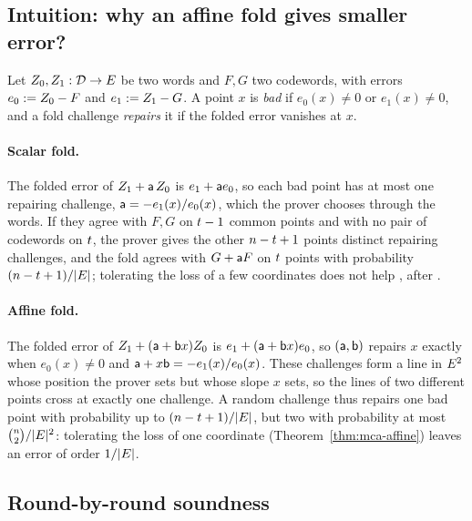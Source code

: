 \subsection{Intuition: why an affine fold gives smaller error?}\label{sec:affine-intuition}

Let $Z_0,Z_1:\mathcal{D}\to E$ be two words and $F,G$ two codewords, with errors $e_0:=Z_0-F$ and $e_1:=Z_1-G$. A point $x$ is \emph{bad} if $e_0(x)\neq0$ or $e_1(x)\neq0$, and a fold challenge \emph{repairs} it if the folded error vanishes at $x$.

\paragraph{Scalar fold.} The folded error of $Z_1+\mathsf{a}\,Z_0$ is $e_1+\mathsf{a} e_0$, so each bad point has at most one repairing challenge, $\mathsf{a}=-e_1(x)/e_0(x)$, which the prover chooses through the words. If they agree with $F,G$ on $t-1$ common points and with no pair of codewords on $t$, the prover gives the other $n-t+1$ points distinct repairing challenges, and the fold agrees with $G+\mathsf{a} F$ on $t$ points with probability $(n-t+1)/|E|$; tolerating the loss of a few coordinates does not help \cite[Prop.~6.1]{CWYZ26}, after \cite[Remark~1.1]{BCIKS20}.

\paragraph{Affine fold.} The folded error of $Z_1+(\mathsf{a}+\mathsf{b} x)Z_0$ is $e_1+(\mathsf{a}+\mathsf{b} x)e_0$, so $(\mathsf{a},\mathsf{b})$ repairs $x$ exactly when $e_0(x)\neq0$ and $\mathsf{a}+x\mathsf{b}=-e_1(x)/e_0(x)$. These challenges form a line in $E^2$ whose position the prover sets but whose slope $x$ sets, so the lines of two different points cross at exactly one challenge. A random challenge thus repairs one bad point with probability up to $(n-t+1)/|E|$, but two with probability at most $\binom{n}{2}/|E|^2$: tolerating the loss of one coordinate (Theorem~\ref{thm:mca-affine}) leaves an error of order $1/|E|$.

\subsection{Round-by-round soundness}\label{sec:soundness}

